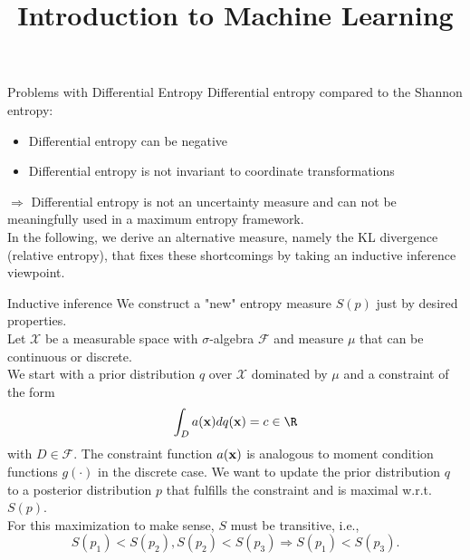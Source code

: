 \documentclass[11pt,compress,t,notes=noshow, xcolor=table]{beamer}
\title{Introduction to Machine Learning}
\begin{document}
    

\begin{vbframe} {Problems with Differential Entropy}
Differential entropy compared to the Shannon entropy:
\begin{itemize}
    \item Differential entropy can be negative
    \item Differential entropy is not invariant to coordinate transformations
\end{itemize}
$\Rightarrow$ Differential entropy is not an uncertainty measure and can not be meaningfully used in a maximum entropy framework. \\
\lz 
In the following, we derive an alternative measure, namely the KL divergence (relative entropy), that fixes these shortcomings by taking an inductive inference viewpoint.  
\end{vbframe}
\begin{vbframe}{Inductive inference}
    We construct a "new" entropy measure $S(p)$ just by desired properties.\\
    \lz
    Let $\mathcal{X}$ be a measurable space with $\sigma$-algebra $\mathcal{F}$ and measure $\mu$ that can be continuous or discrete. \\
    We start with a prior distribution $q$ over $\mathcal{X}$ dominated by $\mu$ and a constraint of the form $$\int_D a(\xv) dq(\xv) = c \in \R$$
    with $D \in \mathcal{F}.$ The constraint function $a(\mathbf{x})$ is analogous to moment condition functions $g(\cdot)$ in the discrete case.
    We want to update the prior distribution $q$ to a posterior distribution $p$ that fulfills the constraint and is maximal w.r.t. $S(p).$  \\
    For this maximization to make sense, $S$ must be transitive, i.e., 
    $$S(p_1) < S(p_2), S(p_2) < S(p_3) \Rightarrow S(p_1) < S(p_3).$$
\end{vbframe}
\end{document}
